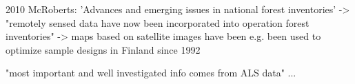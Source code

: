 




2010 McRoberts: 'Advances and emerging issues in national forest inventories'
-> "remotely sensed data have now been incorporated into operation forest inventories"
-> maps based on satellite images have been e.g. been used to optimize sample designs in Finland since 1992

































"most important and well investigated info comes from ALS data" ...

